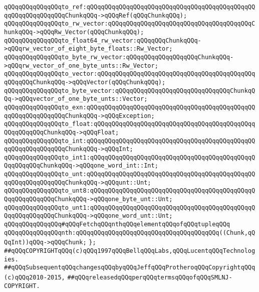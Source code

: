 \verb|qQQqqQQqqQQqqQQqto_ref:qQQqqQQqqQQqqQQqqQQqqQQqqQQqqQQqqQQqqQQqqQQqqQQqqQQqqQQqqQQqqQQqChunkqQQq->qQQqRef(qQQqChunkqQQq);|\newline
\verb|qQQqqQQqqQQqqQQqto_rw_vector:qQQqqQQqqQQqqQQqqQQqqQQqqQQqqQQqqQQqqQQqChunkqQQq->qQQqRw_Vector(qQQqChunkqQQq);|\newline
\verb|qQQqqQQqqQQqqQQqto_float64_rw_vector:qQQqqQQqChunkqQQq->qQQqrw_vector_of_eight_byte_floats::Rw_Vector;|\newline
\verb|qQQqqQQqqQQqqQQqto_byte_rw_vector:qQQqqQQqqQQqqQQqqQQqChunkqQQq->qQQqrw_vector_of_one_byte_unts::Rw_Vector;|\newline
\verb|qQQqqQQqqQQqqQQqto_vector:qQQqqQQqqQQqqQQqqQQqqQQqqQQqqQQqqQQqqQQqqQQqqQQqqQQqChunkqQQq->qQQqVector(qQQqChunkqQQq);|\newline
\verb|qQQqqQQqqQQqqQQqto_byte_vector:qQQqqQQqqQQqqQQqqQQqqQQqqQQqqQQqChunkqQQq->qQQqvector_of_one_byte_unts::Vector;|\newline
\verb|qQQqqQQqqQQqqQQqto_exn:qQQqqQQqqQQqqQQqqQQqqQQqqQQqqQQqqQQqqQQqqQQqqQQqqQQqqQQqqQQqqQQqChunkqQQq->qQQqException;|\newline
\verb|qQQqqQQqqQQqqQQqto_float:qQQqqQQqqQQqqQQqqQQqqQQqqQQqqQQqqQQqqQQqqQQqqQQqqQQqqQQqChunkqQQq->qQQqFloat;|\newline
\verb|qQQqqQQqqQQqqQQqto_int:qQQqqQQqqQQqqQQqqQQqqQQqqQQqqQQqqQQqqQQqqQQqqQQqqQQqqQQqqQQqqQQqChunkqQQq->qQQqInt;|\newline
\verb|qQQqqQQqqQQqqQQqto_int1:qQQqqQQqqQQqqQQqqQQqqQQqqQQqqQQqqQQqqQQqqQQqqQQqqQQqqQQqChunkqQQq->qQQqone_word_int::Int;|\newline
\verb|qQQqqQQqqQQqqQQqto_unt:qQQqqQQqqQQqqQQqqQQqqQQqqQQqqQQqqQQqqQQqqQQqqQQqqQQqqQQqqQQqqQQqChunkqQQq->qQQqunt::Unt;|\newline
\verb|qQQqqQQqqQQqqQQqto_unt8:qQQqqQQqqQQqqQQqqQQqqQQqqQQqqQQqqQQqqQQqqQQqqQQqqQQqqQQqqQQqChunkqQQq->qQQqone_byte_unt::Unt;|\newline
\verb|qQQqqQQqqQQqqQQqto_unt1:qQQqqQQqqQQqqQQqqQQqqQQqqQQqqQQqqQQqqQQqqQQqqQQqqQQqqQQqqQQqChunkqQQq->qQQqone_word_unt::Unt;|\newline
\newline
\verb|qQQqqQQqqQQqqQQq#qQQqFetchqQQqnthqQQqelementqQQqofqQQqtupleqQQq|\newline
\verb|qQQqqQQqqQQqqQQqnth:qQQqqQQqqQQqqQQqqQQqqQQqqQQqqQQqqQQqqQQq((Chunk,qQQqInt))qQQq->qQQqChunk;|\newline
\newline
\verb|};|\newline
\newline
\newline
\newline
\newline
\verb|##qQQqCOPYRIGHTqQQq(c)qQQq1997qQQqBellqQQqLabs,qQQqLucentqQQqTechnologies.|\newline
\verb|##qQQqSubsequentqQQqchangesqQQqbyqQQqJeffqQQqProtheroqQQqCopyrightqQQq(c)qQQq2010-2015,|\newline
\verb|##qQQqreleasedqQQqperqQQqtermsqQQqofqQQqSMLNJ-COPYRIGHT.|\newline

